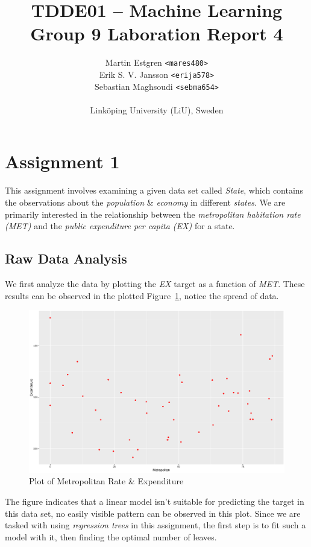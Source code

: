 \documentclass[a4paper,12pt]{article}
\title{TDDE01 -- Machine Learning \\
       Group 9 Laboration Report 4}
\author{{Martin Estgren \texttt{<mares480>}} \\
        {Erik S. V. Jansson \texttt{<erija578>}} \\
        {Sebastian Maghsoudi \texttt{<sebma654>}} \\~\\
        {Linköping University (LiU), Sweden}}
\begin{document}
    \maketitle %

    \section*{Assignment 1}

        This assignment involves examining a given data set called \emph{State}, which contains the observations about the \emph{population} \& \emph{economy} in different \emph{states}. We are primarily interested in the relationship between the \emph{metropolitan habitation rate (MET)} and the \emph{public expenditure per capita (EX)} for a state.

    \subsection*{Raw Data Analysis}

        We first analyze the data by plotting the \emph{EX} target as a function of \emph{MET}. These results can be observed in the plotted Figure~\ref{fig:state}, notice the spread of data.

        \begin{figure}[H]
            \centering
            \caption{Plot of Metropolitan Rate \& Expenditure}
            \label{fig:state}
            \includegraphics[width=\textwidth]{share/A1_data.eps}
        \end{figure}

        The figure indicates that a linear model isn't suitable for predicting the target in this data set, no easily visible pattern can be observed in this plot. Since we are tasked with using \emph{regression trees} in this assignment, the first step is to fit such a model with it, then finding the optimal number of leaves.
\end{document}
